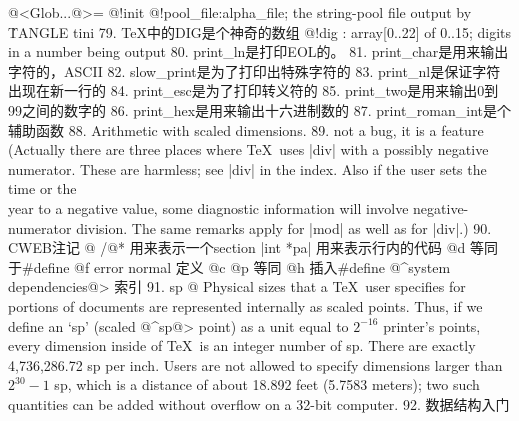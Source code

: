     @<Glob...@>=
    @!init @!pool_file:alpha_file; {the string-pool file output by \.{TANGLE}}
    tini
79. TeX中的DIG是个神奇的数组
    @!dig : array[0..22] of 0..15; {digits in a number being output}
80. print_ln是打印EOL的。
81. print_char是用来输出字符的，ASCII
82. slow_print是为了打印出特殊字符的
83. print_nl是保证字符出现在新一行的
84. print_esc是为了打印转义符的
85. print_two是用来输出0到99之间的数字的
86. print_hex是用来输出十六进制数的
87. print_roman_int是个辅助函数
88. Arithmetic with scaled dimensions.
89. not a bug, it is a feature
    (Actually there are three places where \TeX\ uses |div| with a possibly negative
    numerator. These are harmless; see |div| in the index. Also if the user
    sets the \.{\\time} or the \.{\\year} to a negative value, some diagnostic
    information will involve negative-numerator division. The same remarks
    apply for |mod| as well as for |div|.)
90. CWEB注记
    @ /@* 用来表示一个section
    |int *pa| 用来表示行内的代码
    @d 等同于#define
    @f error normal 定义
    @c @p 等同
    @h 插入#define
    @^system dependencies@> 索引
91. sp
    @ Physical sizes that a \TeX\ user specifies for portions of documents are
    represented internally as scaled points. Thus, if we define an `sp' (scaled
    @^sp@>
    point) as a unit equal to $2^{-16}$ printer's points, every dimension
    inside of \TeX\ is an integer number of sp. There are exactly
    4,736,286.72 sp per inch.  Users are not allowed to specify dimensions
    larger than $2^{30}-1$ sp, which is a distance of about 18.892 feet (5.7583
    meters); two such quantities can be added without overflow on a 32-bit
    computer.
92. 数据结构入门
